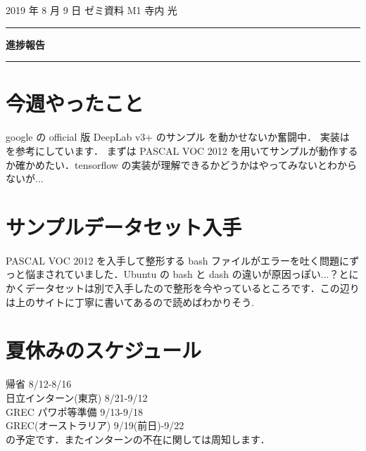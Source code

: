 \documentclass[onecolumn]{ujarticle}   %
\begin{document}
	
	\noindent
	
	\hspace{1em}
	2019 年 8 月 9 日
	ゼミ資料
	\hfill
	M1 寺内 光
	
	\vspace{2mm}
	
	\hrule
	
	\begin{center}
		{\Large \bf 進捗報告}
	\end{center}
	
	
	\hrule
	\vspace{3mm}
	
	\section{今週やったこと}
	google の official 版 DeepLab v3+ のサンプル \cite{deeplabv3_official} を動かせないか奮闘中．
	実装は \cite{cite1, cite2, cite3} を参考にしています．
	まずは PASCAL VOC 2012 を用いてサンプルが動作するか確かめたい．tensorflow の実装が理解できるかどうかはやってみないとわからないが...       
	
	\section{サンプルデータセット入手}
	PASCAL VOC 2012 \cite{pascal-voc-2012} を入手して整形する bash ファイルがエラーを吐く問題にずっと悩まされていました．Ubuntu の bash と dash の違いが原因っぽい...？とにかくデータセットは別で入手したので整形を今やっているところです．この辺りは上のサイトに丁寧に書いてあるので読めばわかりそう.
	                                                                                                                                             

	\section{夏休みのスケジュール}\noindent
	帰省 8/12-8/16\\
	日立インターン(東京) 8/21-9/12\\
	GREC パワポ等準備 9/13-9/18\\
	GREC(オーストラリア) 9/19(前日)-9/22\\
	の予定です．またインターンの不在に関しては周知します．
	
	
	
\end{document}
